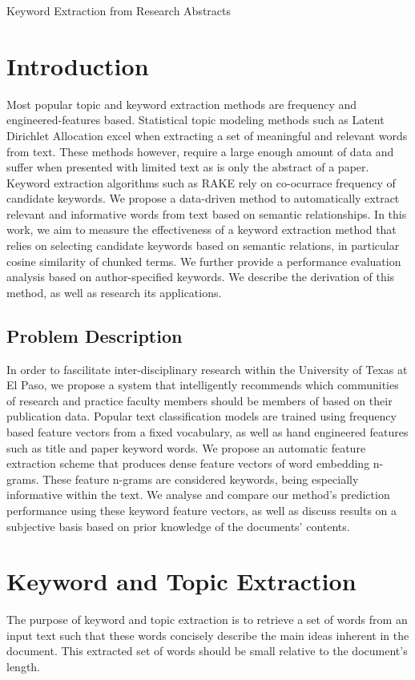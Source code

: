 \documentclass[12pt]{article}
\begin{document}
\begin{center}

Keyword Extraction from Research Abstracts


\end{center}

\section{Introduction}
Most popular topic and keyword extraction methods are frequency and engineered-features based. Statistical topic modeling methods such as Latent Dirichlet
Allocation excel when extracting a set of meaningful and relevant words from text. These methods however, require a large enough amount of data
and suffer when presented with limited text as is only the abstract of a paper. Keyword extraction algorithms such as RAKE rely on co-ocurrace frequency
of candidate keywords.
We propose a data-driven method to automatically extract relevant and informative words from text based on semantic relationships.
In this work, we aim to measure the effectiveness of a keyword extraction method that relies on selecting candidate keywords based on semantic relations,
in particular cosine similarity of chunked terms. We further provide a performance evaluation analysis based on author-specified keywords. We describe the derivation of this method, as well as research its applications.

\subsection{Problem Description}
In order to fascilitate inter-disciplinary research within the University of Texas at El Paso, we propose a system that intelligently
recommends which communities of research and practice faculty members should be members of based on their publication data. Popular text classification models
are trained using frequency based feature vectors from a fixed vocabulary, as well as hand engineered features such as title and paper keyword words. We propose
an automatic feature extraction scheme that produces dense feature vectors of word embedding n-grams. These feature n-grams are
considered keywords, being especially informative within the text. We analyse and compare our method's prediction performance using these keyword feature vectors,
as well as discuss results on a subjective basis based on prior knowledge of the documents' contents.


\section{Keyword and Topic Extraction}
The purpose of keyword and topic extraction is to retrieve a set of words from an input text such that these words concisely describe the main ideas inherent in the document.
This extracted set of words should be small relative to the document's length.
\end{document}
